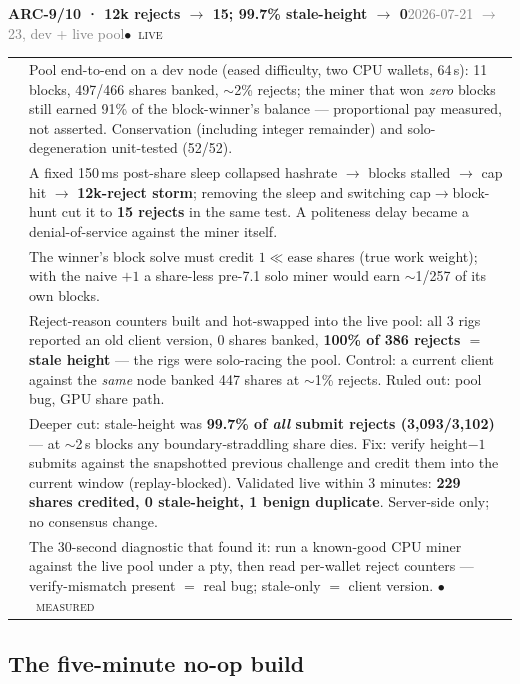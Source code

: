 \documentclass[10pt,a4paper]{article}
\makeatletter
\newcommand{\stM}{\textcolor{sigilcyan}{$\bullet$}~{\scriptsize\textcolor{sigilcyan}{\textsc{measured}}}}
\newcommand{\stL}{\textcolor{sigilcyan}{$\bullet$}~{\scriptsize\textcolor{sigilcyan}{\textsc{live}}}}
\newcommand{\measured}[1]{\textcolor{sigilcyan}{\textbf{#1}}}
\newcommand{\frow}[2]{{\footnotesize\textcolor{gray}{\textsc{#1}}}\;&\small #2\\}
\newenvironment{mentry}[4]{%
\begin{tcolorbox}[enhanced,breakable,colback=white,colframe=slate,boxrule=0.6pt,arc=2pt,
  left=8pt,right=8pt,top=6pt,bottom=6pt,
  borderline west={3pt}{0pt}{sigilcyan!70!slate}]
{\small\textbf{#1 · #2}\hfill{\footnotesize\textcolor{gray}{#3}}\quad#4}\\[4pt]
\begin{tabular}{@{}>{\raggedleft\arraybackslash}p{1.8cm}p{13.2cm}@{}}
}{%
\end{tabular}
\end{tcolorbox}\vspace{2pt}}
\makeatother
\begin{document}
\begin{mentry}{ARC-9/10}{12k rejects $\to$ 15; 99.7\% stale-height $\to$ 0}{2026-07-21 $\to$ 23, dev + live pool}{\stL}
\frow{e2e}{Pool end-to-end on a dev node (eased difficulty, two CPU wallets, 64\,s):
11 blocks, 497/466 shares banked, $\sim$2\% rejects; the miner that won \emph{zero} blocks
still earned 91\% of the block-winner's balance --- proportional pay measured, not
asserted. Conservation (including integer remainder) and solo-degeneration unit-tested
(52/52).}
\frow{lesson 1}{A fixed 150\,ms post-share sleep collapsed hashrate $\to$ blocks stalled
$\to$ cap hit $\to$ \measured{12k-reject storm}; removing the sleep and switching
cap$\to$block-hunt cut it to \measured{15 rejects} in the same test. A politeness delay
became a denial-of-service against the miner itself.}
\frow{lesson 2}{The winner's block solve must credit $1\ll\mathrm{ease}$ shares (true
work weight); with the naive $+1$ a share-less pre-7.1 solo miner would earn
$\sim$1/257 of its own blocks.}
\frow{live 1}{Reject-reason counters built and hot-swapped into the live pool: all 3 rigs
reported an old client version, 0 shares banked, \measured{100\% of 386 rejects $=$
stale height} --- the rigs were solo-racing the pool. Control: a current client against
the \emph{same} node banked 447 shares at $\sim$1\% rejects. Ruled out: pool bug, GPU
share path.}
\frow{live 2}{Deeper cut: stale-height was \measured{99.7\% of \emph{all} submit rejects
(3{,}093/3{,}102)} --- at $\sim$2\,s blocks any boundary-straddling share dies. Fix:
verify height$-1$ submits against the snapshotted previous challenge and credit them into
the current window (replay-blocked). Validated live within 3 minutes: \measured{229
shares credited, 0 stale-height, 1 benign duplicate}. Server-side only; no consensus
change.}
\frow{recipe}{The 30-second diagnostic that found it: run a known-good CPU miner against
the live pool under a pty, then read per-wallet reject counters --- verify-mismatch
present $=$ real bug; stale-only $=$ client version. \stM}
\end{mentry}

\subsection{The five-minute no-op build}
\end{document}

